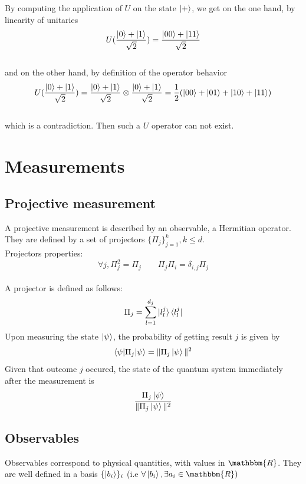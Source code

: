\documentclass{article}
\begin{document}
By computing the application of $U$ on the state $\ket{+}$, we get on the one hand, by linearity of unitaries
\begin{equation}
    U(\frac{\ket{0}+\ket{1}}{\sqrt{2}}) = \frac{\ket{00}+\ket{11}}{\sqrt{2}}
\end{equation}
\\
and on the other hand, by definition of the operator behavior
\begin{equation}
    U(\frac{\ket{0}+\ket{1}}{\sqrt{2}}) = \frac{\ket{0}+\ket{1}}{\sqrt{2}} \otimes \frac{\ket{0}+\ket{1}}{\sqrt{2}}
    =\frac{1}{2}(\ket{00}+\ket{01}+\ket{10}+\ket{11})
\end{equation}
\\
which is a contradiction. Then such a $U$ operator can not exist.
\section{Measurements}
\subsection{Projective measurement}
A projective measurement is described by an observable, a Hermitian operator. They are defined by a set of projectors $\{\Pi_j\}_{j=1}^k, k \leq d$.\\
Projectors properties:
\begin{equation}
    \forall j, \Pi_j^2 = \Pi_j \qquad \Pi_j\Pi_i = \delta_{i,j}\Pi_j
\end{equation}
\\\noindent
A projector is defined as follows:
\begin{equation}
    \Pi_j = \sum_{l=1}^{d_j}\ket{l_l^j}\bra{l_l^j}
\end{equation}
Upon measuring the state $\ket{\psi}$, the probability of getting result $j$ is given by
\begin{equation}
    \braket{\psi|\Pi_j|\psi} = \| \Pi_j\ket{\psi}\|^2
\end{equation}
Given that outcome $j$ occured, the state of the quantum system immediately after the measurement is
\begin{equation}
    \frac{\Pi_j\ket{\psi}}{\| \Pi_j\ket{\psi}\|^2}
\end{equation}

\subsection{Observables}
Observables correspond to physical quantities, with values in $\mathbbm{R}$.
They are well defined in a basis $\{\ket{b_i}\}_i$ (i.e $\forall \ket{b_i}, \exists a_i \in \mathbbm{R})$
\end{document}
